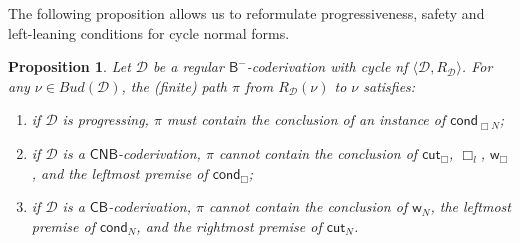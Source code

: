 \documentclass[manuscript,screen]{acmart}
\newcommand{\anupam}[1]{\todo{A: #1}}
\newtheorem{prop}[thm]{Proposition}
\theoremstyle{definition}
\theoremstyle{remark}
\newcommand{\n}{N}
\newcommand{\sq}{\Box}
\newcommand{\sqn}{{\sq\n}}
\newcommand{\sn}{\sqn}
\newcommand{\cnd}{\mathsf{cond}}
\newcommand{\bc}{\mathsf{B}}
\newcommand{\bcnorec}{\bc^{-}}
\newcommand{\nested}{\mathsf{N}}
\newcommand{\der}{\mathcal{D}}
\newcommand{\rd}{{R}_\der}
\newcommand{\derrd}{\langle \der, \rd \rangle}
\newcommand{\bud}{\mathit{Bud}}
\newcommand{\wk}{\mathsf{w}}
\newcommand{\cut}{\mathsf{cut}}
\newcommand{\boxlef}{\sq_l}
\newcommand{\sql}{\boxlef}
\newcommand{\cyclic}{\mathsf{C}}
\newcommand{\cbc}{\cyclic\bc}
\newcommand{\ncbc}{\cyclic\nested\bc}
\begin{document}


The following proposition allows us to reformulate   progressiveness, safety and left-leaning conditions for cycle normal forms. 
\begin{prop}\label{prop:structureofcycles}
Let $\der$ be a regular   $\bcnorec$-coderivation with cycle nf $\derrd$. 
For any  $\nu \in \bud(\der)$, the (finite) path $\pi$ from $\rd(\nu)$ to $\nu$ satisfies:
\begin{enumerate}
\item \label{enum:budcompanion0} if  $\der$ is progressing, $\pi$ must contain the conclusion of an instance of $\cnd_{\sn}$;
    \item \label{enum:budcompanion1} if  $\der$ is a $ \ncbc$-coderivation, $\pi$ cannot  contain  the conclusion of  $\cut_{\sq}$, $\sql$,  $\wk_{\sq}$, and  the   leftmost premise of  $\cnd_{\sq}$;
    \item \label{enum:budcompanion3} if $\der$ is a $\cbc$-coderivation,  $\pi$  cannot contain the conclusion of $\wk_{\n}$, the leftmost premise of  $\cnd_{\n}$, and the rightmost premise of $\cut_{\n}$.
\end{enumerate}
\end{prop}
\end{document}
